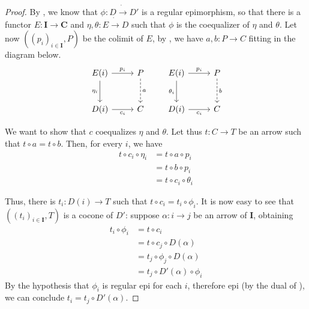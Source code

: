 \documentclass[runningheads,envcountsect]{llncs}
\newcommand{\cat}[1]{\ensuremath{\mathbf{#1}}}
\theoremstyle{plain}
\theoremstyle{definition}
\begin{document}
\begin{proof}
    By , we know that $\phi: D \dot\to D'$ is a regular epimorphism, so that there is a functor $E: \cat{I \to C}$ and $\eta, \theta: E \dot\to D$ such that $\phi$ is the coequalizer of $\eta$ and $\theta$. Let now $((p_i)_{i \in \cat I}, P)$ be the colimit of $E$, by , we have $a, b: P \to C$ fitting in the diagram below.
    \[
        \begin{tikzcd}[row sep = 26, column sep = 26]
            E(i) \ar[r, "{p_i}"] \ar[d, "{\eta_i}"swap] & P \ar[d, dashed, "a"] \\
            D(i) \ar[r, "{c_i}"swap] & C
        \end{tikzcd}
        \qquad
        \begin{tikzcd}[row sep = 26, column sep = 26]
            E(i) \ar[r, "{p_i}"] \ar[d, "{\theta_i}"swap] & P \ar[d, dashed, "b"] \\
            D(i) \ar[r, "{c_i}"swap] & C
        \end{tikzcd}
    \]

    We want to show that $c$ coequalizes $\eta$ and $\theta$. Let thus $t: C \to T$ be an arrow such that $t \circ a = t \circ b$. Then, for every $i$, we have
    \begin{align*}
        t \circ c_i \circ \eta_i &= t \circ a \circ p_i \\
                                 &= t \circ b \circ p_i \\
                                 &= t \circ c_i \circ \theta_i
    \end{align*}    

    Thus, there is $t_i: D(i) \to T$ such that $t\circ c_i = t_i \circ \phi_i$. It is now easy to see that $((t_i)_{i \in \cat I}, T)$ is a cocone of $D'$: suppose $\alpha: i \to j$ be an arrow of $\cat I$, obtaining
    \begin{align*}
        t_i \circ \phi_i &= t \circ c_i \\
                         &= t \circ c_j \circ D(\alpha) \\
                         &= t_j \circ \phi_j \circ D(\alpha) \\
                         &= t_j \circ D'(\alpha) \circ \phi_i
    \end{align*}
    By the hypothesis that $\phi_i$ is regular epi for each $i$, therefore epi (by the dual of ), we can conclude $t_i = t_j \circ D'(\alpha)$.
    

\end{proof}
\end{document}
